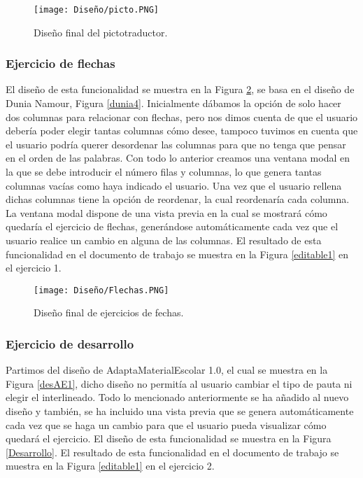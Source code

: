 \begin{figure}[ht!]
  \centering
  \texttt{[image: Diseño/picto.PNG]}
  \caption{Diseño final del pictotraductor.}
  \label{pictotraductor}
\end{figure}


\subsubsection{Ejercicio de flechas}
El diseño de esta funcionalidad se muestra en la Figura \ref{flechas}, se basa en el diseño de Dunia Namour, Figura \ref{dunia4}. Inicialmente dábamos la opción de solo hacer dos columnas para relacionar con flechas, pero nos dimos cuenta de que el usuario debería poder elegir tantas columnas cómo desee, tampoco tuvimos en cuenta que el usuario podría querer desordenar las columnas para que no tenga que pensar en el orden de las palabras. Con todo lo anterior creamos una ventana modal en la que se debe introducir el número filas y columnas, lo que genera tantas columnas vacías como haya indicado el usuario. Una vez que el usuario rellena dichas columnas tiene la opción de reordenar, la cual reordenaría cada columna. La ventana modal dispone de una vista previa en la cual se mostrará cómo quedaría el ejercicio de flechas, generándose automáticamente cada vez que el usuario realice un cambio en alguna de las columnas. El resultado de esta funcionalidad en el documento de trabajo se muestra en la Figura \ref{editable1} en el ejercicio 1.

\begin{figure}[ht!]
  \centering
  \texttt{[image: Diseño/Flechas.PNG]}
  \caption{Diseño final de ejercicios de fechas.}
  \label{flechas}
\end{figure}

\subsubsection{Ejercicio de desarrollo}
 Partimos del diseño de AdaptaMaterialEscolar 1.0, el cual se muestra en la Figura \ref{desAE1}, dicho diseño no permitía al usuario cambiar el tipo de pauta ni elegir el interlineado. Todo lo mencionado anteriormente se ha añadido al nuevo diseño y también, se ha incluido una vista previa que se genera automáticamente cada vez que se haga un cambio para que el usuario pueda visualizar cómo quedará el ejercicio. El diseño de esta funcionalidad se muestra en la Figura \ref{Desarrollo}. El resultado de esta funcionalidad en el documento de trabajo se muestra en la Figura \ref{editable1} en el ejercicio 2.   
 
